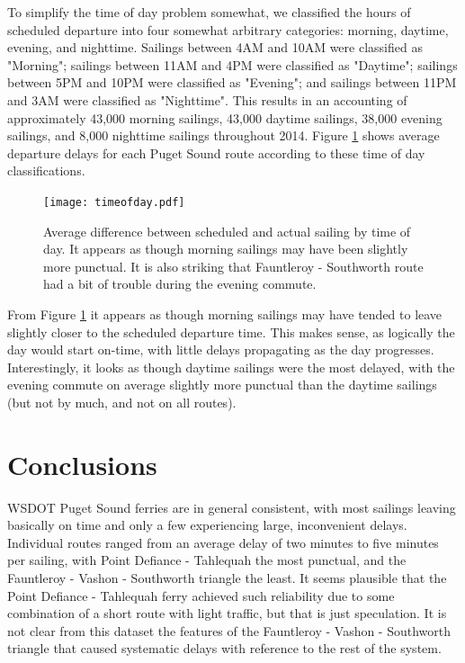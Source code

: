 \documentclass[11pt, letterpaper]{article}
\begin{document}
To simplify the time of day problem somewhat, we classified the hours of scheduled departure into four somewhat arbitrary categories: morning, daytime, evening, and nighttime. Sailings between 4AM and 10AM were classified as "Morning"; sailings between 11AM and 4PM were classified as "Daytime"; sailings between 5PM and 10PM were classified as "Evening"; and sailings between 11PM and 3AM were classified as "Nighttime". This results in an accounting of approximately 43,000 morning sailings, 43,000 daytime sailings, 38,000 evening sailings, and 8,000 nighttime sailings throughout 2014. Figure \ref{timeofday} shows average departure delays for each Puget Sound route according to these time of day classifications.

\begin{figure}[htbp]
\begin{center}
\texttt{[image: timeofday.pdf]}
\caption{Average difference between scheduled and actual sailing by time of day. It appears as though morning sailings may have been slightly more punctual. It is also striking that Fauntleroy - Southworth route had a bit of trouble during the evening commute.}
\label{timeofday}
\end{center}
\end{figure}

From Figure \ref{timeofday} it appears as though morning sailings may have tended to leave slightly closer to the scheduled departure time. This makes sense, as logically the day would start on-time, with little delays propagating as the day progresses. Interestingly, it looks as though daytime sailings were the most delayed, with the evening commute on average slightly more punctual than the daytime sailings (but not by much, and not on all routes).


\section*{Conclusions}

WSDOT Puget Sound ferries are in general consistent, with most sailings leaving basically on time and only a few experiencing large, inconvenient delays. Individual routes ranged from an average delay of two minutes to five minutes per sailing, with Point Defiance - Tahlequah the most punctual, and the Fauntleroy - Vashon - Southworth triangle the least. It seems plausible that the Point Defiance - Tahlequah ferry achieved such reliability due to some combination of a short route with light traffic, but that is just speculation. It is not clear from this dataset the features of the Fauntleroy - Vashon - Southworth triangle that caused systematic delays with reference to the rest of the system.
\end{document}
